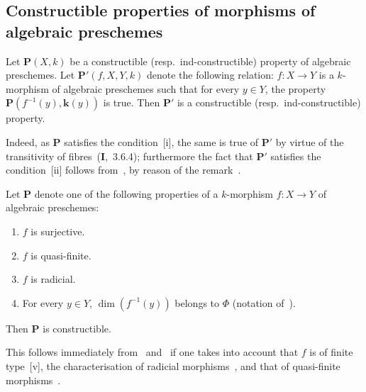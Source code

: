 \subsection{Constructible properties of morphisms of algebraic preschemes}
\label{subsection:IV.9.3}

\begin{proposition}[9.3.1]
\label{IV.9.3.1}
Let $\mathbf{P}(X,k)$ be a constructible \textnormal{(}resp.\ ind-constructible\textnormal{)} property of algebraic preschemes.
Let $\mathbf{P}'(f,X,Y,k)$ denote the following relation: $f:X\to Y$ is a $k$-morphism of algebraic preschemes such that for every $y\in Y$, the property $\mathbf{P}(f^{-1}(y),\mathbf{k}(y))$ is true.
Then $\mathbf{P}'$ is a constructible \textnormal{(}resp.\ ind-constructible\textnormal{)} property.
\end{proposition}

Indeed, as $\mathbf{P}$ satisfies the condition~[i], the same is true of $\mathbf{P}'$ by virtue of the transitivity of fibres~(\textbf{I},~3.6.4); furthermore the fact that $\mathbf{P}'$ satisfies the condition~[ii] follows from~, by reason of the remark~.

\begin{proposition}[9.3.2]
\label{IV.9.3.2}
Let $\mathbf{P}$ denote one of the following properties of a $k$-morphism $f:X\to Y$ of algebraic preschemes:
\begin{enumerate}[label=(\roman*)]
  \item $f$ is surjective.
  \item $f$ is quasi-finite.
  \item $f$ is radicial.
  \item For every $y\in Y$, $\dim(f^{-1}(y))$ belongs to $\Phi$ \textnormal{(}notation of~\textnormal{)}.
\end{enumerate}
Then $\mathbf{P}$ is constructible.
\end{proposition}

This follows immediately from~ and~ if one takes into account that $f$ is of finite type~[v], the characterisation of radicial morphisms~, and that of quasi-finite morphisms~.

